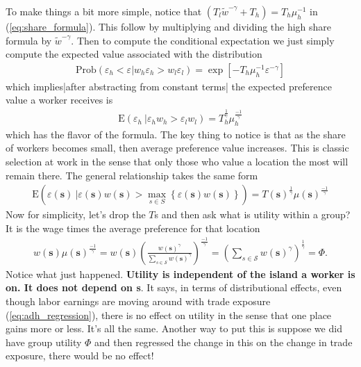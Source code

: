 \documentclass[pdftex,12pt]{article}
\begin{document}
\medskip
\noindent To make things a bit more simple, notice that $\left(T_l\tilde w ^{-\gamma} + T_h \right) = T_h \mu_h^{-1}$ in (\ref{eq:share_formula}). This follow by multiplying and dividing the high share formula by $\tilde w^{-\gamma}$. Then to compute the conditional expectation we just simply compute the expected value associated with the distribution
\begin{align}
\mathrm{Prob}\left( \varepsilon_h < \varepsilon | w_h \varepsilon_h >  w_l\varepsilon_l\right) = \exp\left[-T_h\mu_h^{-1}\varepsilon^{-\gamma}\right]
\end{align}
which implies|after abstracting from constant terms| the expected preference value a worker receives is
\begin{align}
\mathrm{E}\left(\varepsilon_h\ |\varepsilon_h w_h > \varepsilon_l w_l\right) = T_h^{\frac{1}{\gamma}} \mu_h^{\frac{-1}{\gamma}}
\end{align}
which has the flavor of the \citet{arkolakis2012new} formula. The key thing to notice is that as the share of workers becomes small, then average preference value increases. This is classic selection at work in the sense that only those who value a location the most will remain there. The general relationship takes the same form
\begin{align}
\mathrm{E}\left(\varepsilon(\textbf{s}) \ |\varepsilon(\textbf{s}) w(\textbf{s}) > \max_{s \in S}\left\{\varepsilon(\textbf{s}) w(\textbf{s})\right\}\right) = T(\textbf{s})^{\frac{1}{\gamma}} \mu(\textbf{s})^{\frac{-1}{\gamma}}
\end{align}
Now for simplicity, let's drop the $T$s and then ask what is utility within a group? It is the wage times the average preference for that location
\begin{align}
w(\textbf{s}) \mu(\textbf{s})^{\frac{-1}{\gamma}} =  w(\textbf{s}) \left(\frac{w(\textbf{s})^{\gamma}}{\sum_{s \in \mathcal{S}} w(\textbf{s})^{\gamma}}\right)^{\frac{-1}{\gamma}}
 =  \left(\sum_{s \in \mathcal{S}} w(\textbf{s})^{\gamma}\right)^{\frac{1}{\gamma}} = \Phi.
\label{eq:expected_utility_phi}
\end{align}
Notice what just happened. \textbf{Utility is independent of the island a worker is on. It does not depend on \textbf{s}}. It says, in terms of distributional effects, even though labor earnings are moving around with trade exposure (\ref{eq:adh_regression}), there is no effect on utility in the sense that one place gains more or less. It's all the same. Another way to put this is suppose we did have group utility $\Phi$ and then regressed the change in this on the change in trade exposure, there would be no effect!
\end{document}
